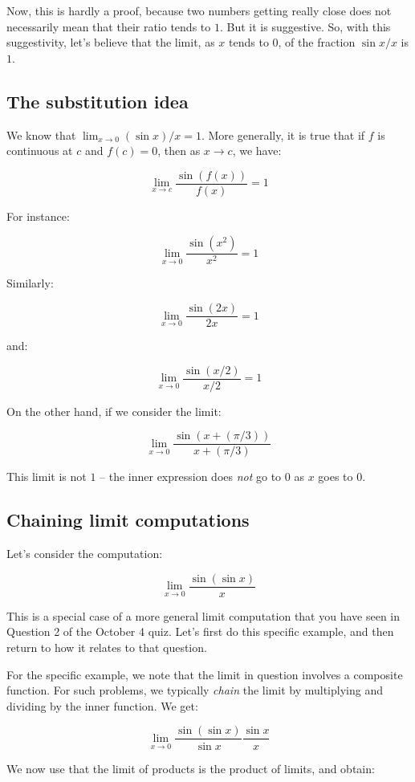 \documentclass[10pt]{amsart}
\begin{document}
Now, this is hardly a proof, because two numbers getting really close
does not necessarily mean that their ratio tends to $1$. But it is
suggestive. So, with this suggestivity, let's believe that the limit,
as $x$ tends to $0$, of the fraction $\sin x / x$ is $1$.

\subsection{The substitution idea}

We know that $\lim_{x \to 0} (\sin x)/x = 1$. More generally, it is
true that if $f$ is continuous at $c$ and $f(c) = 0$, then as $x \to c$,
we have:

$$\lim_{x \to c} \frac{\sin(f(x))}{f(x)} = 1$$

For instance:

$$\lim_{x \to 0} \frac{\sin(x^2)}{x^2} = 1$$

Similarly:

$$\lim_{x \to 0} \frac{\sin(2x)}{2x} = 1$$

and:

$$\lim_{x \to 0} \frac{\sin(x/2)}{x/2} = 1$$

On the other hand, if we consider the limit:

$$\lim_{x \to 0} \frac{\sin(x + (\pi/3))}{x + (\pi/3)}$$

This limit is not $1$ -- the inner expression does {\em not} go to $0$
as $x$ goes to $0$.
\subsection{Chaining limit computations}

Let's consider the computation:

$$\lim_{x \to 0} \frac{\sin(\sin x)}{x}$$

This is a special case of a more general limit computation that you
have seen in Question 2 of the October 4 quiz. Let's first do this
specific example, and then return to how it relates to that question.

For the specific example, we note that the limit in question involves
a composite function. For such problems, we typically {\em chain} the
limit by multiplying and dividing by the inner function. We get:

$$\lim_{x \to 0} \frac{\sin(\sin x)}{\sin x} \frac{\sin x}{x}$$

We now use that the limit of products is the product of limits, and
obtain:
\end{document}
